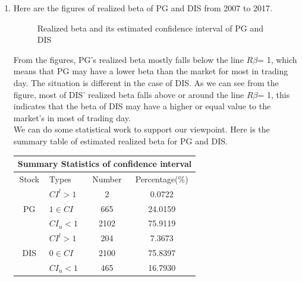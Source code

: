 \documentclass[12pt,letterpaper]{article}
\begin{document}
\begin{enumerate}[label=\textbf{(\Alph*)}]
\item 
Here are the figures of realized beta of PG and DIS from 2007 to 2017.
\begin{figure}[H]
            \centering
            \caption{Realized beta and its estimated confidence interval of PG and DIS}
\end{figure}
From the figures, PG’s realized beta mostly falls below the line $R\beta$= 1, which means that PG may have a lower beta than the market for most in trading day. The situation is different in the case of DIS. As we can see from the figure, most of DIS’ realized beta falls above or around the line $R\beta$= 1, this indicates that the beta of DIS may have a higher or equal value to the market's in most of trading day.\\

We can do some statistical work to support our viewpoint. Here is the summary table of estimated realized beta for PG and DIS.

\begin{table}[ht]
\centering %
\begin{tabular}{clcc} %
\hline\hline %
\multicolumn{4}{c}{Summary Statistics of confidence interval}\\ [0.5ex]%
\hline Stock& Types & Number & Percentage(\%)\\
\hline
 & $CI^{l}>1$ & 2 & 0.0722\\ 
PG &$1 \in CI$ & 665 & 24.0159 \\
& $CI_{u}<1$ & 2102 & 75.9119 \\
\hline
 & $CI^{l}>1$  & 204 & 7.3673\\
DIS&$0 \in CI$ & 2100 & 75.8397 \\
& $CI_{u}<1$  & 465 & 16.7930 \\
\hline %
\end{tabular}
\end{table}


\end{enumerate}
\end{document}
